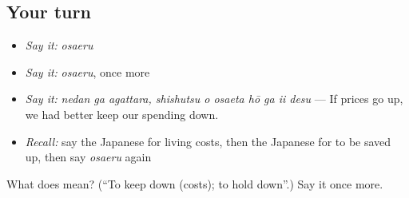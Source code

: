 \subsection*{Your turn}
\begin{itemize}
\raggedright
  \item \emph{Say it:} \emph{osaeru}
  \item \emph{Say it:} \emph{osaeru}, once more
  \item \emph{Say it:} \emph{nedan ga agattara, shishutsu o osaeta hō ga ii desu} — If prices go up, we had better keep our spending down.
  \item \emph{Recall:} say the Japanese for living costs, then the Japanese for to be saved up, then say \emph{osaeru} again
\end{itemize}

\begin{tcolorbox}[breakable,colback=teal!4,colframe=teal!35!black,title={Before you move on}]
What does  mean? (\textquotedblleft{}To keep down (costs); to hold down\textquotedblright{}.) Say it once more.
\end{tcolorbox}
